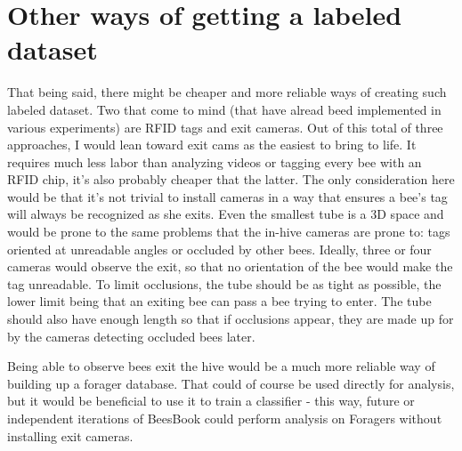 \section{Other ways of getting a labeled dataset}

That being said, there might be cheaper and more reliable ways of creating such labeled dataset. Two that come to mind (that have alread beed implemented in various experiments) are RFID tags and exit 
cameras. Out of this total of three approaches, I would lean toward exit cams as the easiest to bring to life. It requires much less labor than analyzing videos or tagging every bee with an RFID chip, it's also probably cheaper that the latter. The only consideration here would be that it's not trivial to install cameras in a way that ensures a bee's tag will always be recognized as she exits. Even the smallest tube is a 3D space and would be prone to the same problems that the in-hive cameras are prone to: tags oriented at unreadable angles or occluded by other bees. Ideally, three or four cameras would observe the exit, so that no orientation of the bee would make the tag unreadable. To limit occlusions, the tube should be as tight as possible, the lower limit being that an exiting bee can pass a bee trying to enter. The tube should also have enough length so that if occlusions appear, they are made up for by the cameras detecting occluded bees later.

Being able to observe bees exit the hive would be a much more reliable way of building up a forager database. That could of course be used directly for analysis, but it would be beneficial to use it to train a classifier - this way, future or independent iterations of BeesBook could perform analysis on Foragers without installing exit cameras.




